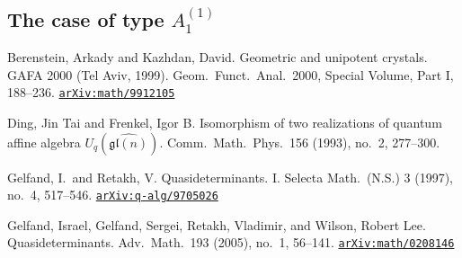 \documentclass[12pt,twoside]{article}
\newcommand\arxivref[1]{\href{http://arxiv.org/abs/#1}{\tt arXiv:#1}}
\theoremstyle{plain} %
\theoremstyle{definition} %
\theoremstyle{definition} %
\numberwithin{theorem}{section}
\numberwithin{equation}{section}
\numberwithin{figure}{section}
\numberwithin{table}{section}
\begin{document}

\subsection{The case of type $A^{(1)}_{1}$}
\label{sec:A^{(1)}_1}


\begin{thebibliography}{99}

Berenstein, Arkady and Kazhdan, David. 
Geometric and unipotent crystals. 
GAFA 2000 (Tel Aviv, 1999). 
Geom.\ Funct.\ Anal.\ 2000, Special Volume, Part I, 188--236.
\arxivref{math/9912105}



Ding, Jin Tai and Frenkel, Igor B. 
Isomorphism of two realizations of quantum affine algebra $U_q(\widehat{\mathfrak{gl}(n)})$. 
Comm.\ Math.\ Phys.\ 156 (1993), no.~2, 277--300.

%

Gelfand, I.\ and Retakh, V. 
Quasideterminants. I. 
Selecta Math.\ (N.S.) 3 (1997), no.~4, 517--546.
\arxivref{q-alg/9705026}

Gelfand, Israel, Gelfand, Sergei, Retakh, Vladimir, and Wilson, Robert Lee. Quasideterminants. 
Adv.\ Math.\ 193 (2005), no.~1, 56--141.
\arxivref{math/0208146}


\end{thebibliography}
\end{document}
